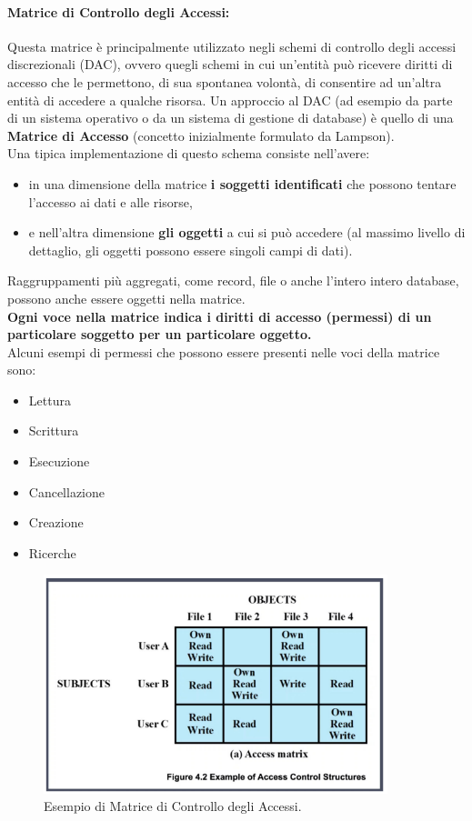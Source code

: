 \paragraph{Matrice di Controllo degli Accessi: }
Questa matrice è principalmente utilizzato negli schemi di controllo degli accessi discrezionali (DAC), ovvero quegli schemi in cui un'entità può ricevere diritti di accesso che le permettono, di sua spontanea volontà, di consentire ad un'altra entità di accedere a qualche risorsa. Un approccio al DAC (ad esempio da parte di un sistema operativo o da un sistema di gestione di database) è quello di una \textbf{Matrice di Accesso} (concetto inizialmente formulato da Lampson).\\
Una tipica implementazione di questo schema consiste nell'avere:
\begin{itemize}
    \item in una dimensione della matrice \textbf{i soggetti identificati} che possono tentare l'accesso ai dati e alle risorse,
    \item e nell'altra dimensione \textbf{gli oggetti} a cui si può accedere (al massimo livello di dettaglio, gli oggetti possono essere singoli campi di dati).
\end{itemize}
Raggruppamenti più aggregati, come record, file o anche l'intero intero database, possono
anche essere oggetti nella matrice.\\
\textbf{Ogni voce nella matrice indica i diritti di accesso (permessi) di un particolare soggetto per un particolare oggetto.}\\
Alcuni esempi di permessi che possono essere presenti nelle voci della matrice sono:
\begin{itemize}
    \item Lettura
    \item Scrittura
    \item Esecuzione
    \item Cancellazione
    \item Creazione
    \item Ricerche
\end{itemize}

\begin{figure}[H]
    \centering
    \includegraphics[width=10cm, keepaspectratio]{capitoli/policy/imgs/matrix_access_control.png}
    \caption{Esempio di Matrice di Controllo degli Accessi.}
\end{figure}

